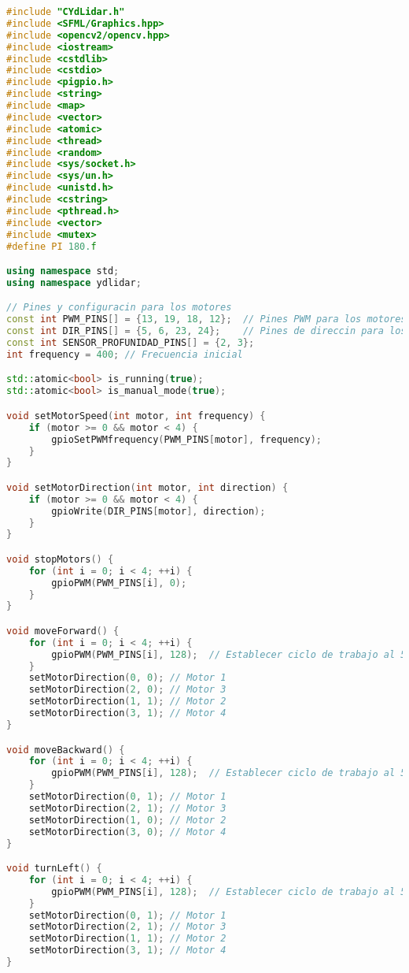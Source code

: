     \begin{lstlisting}[language={C++}, caption={Primer ajuste de c\'odigo}, label={Script}]
#include "CYdLidar.h"
#include <SFML/Graphics.hpp>
#include <opencv2/opencv.hpp>
#include <iostream>
#include <cstdlib>
#include <cstdio>
#include <pigpio.h>
#include <string>
#include <map>
#include <vector>
#include <atomic>
#include <thread>
#include <random>
#include <sys/socket.h>
#include <sys/un.h>
#include <unistd.h>
#include <cstring>
#include <pthread.h>
#include <vector>
#include <mutex>
#define PI 180.f

using namespace std;
using namespace ydlidar;

// Pines y configuracin para los motores
const int PWM_PINS[] = {13, 19, 18, 12};  // Pines PWM para los motores
const int DIR_PINS[] = {5, 6, 23, 24};    // Pines de direccin para los motores
const int SENSOR_PROFUNIDAD_PINS[] = {2, 3};
int frequency = 400; // Frecuencia inicial

std::atomic<bool> is_running(true);
std::atomic<bool> is_manual_mode(true);

void setMotorSpeed(int motor, int frequency) {
    if (motor >= 0 && motor < 4) {
        gpioSetPWMfrequency(PWM_PINS[motor], frequency);
    }
}

void setMotorDirection(int motor, int direction) {
    if (motor >= 0 && motor < 4) {
        gpioWrite(DIR_PINS[motor], direction);
    }
}

void stopMotors() {
    for (int i = 0; i < 4; ++i) {
        gpioPWM(PWM_PINS[i], 0);
    }
}

void moveForward() {
    for (int i = 0; i < 4; ++i) {
        gpioPWM(PWM_PINS[i], 128);  // Establecer ciclo de trabajo al 50%
    }
    setMotorDirection(0, 0); // Motor 1
    setMotorDirection(2, 0); // Motor 3
    setMotorDirection(1, 1); // Motor 2
    setMotorDirection(3, 1); // Motor 4
}

void moveBackward() {
    for (int i = 0; i < 4; ++i) {
        gpioPWM(PWM_PINS[i], 128);  // Establecer ciclo de trabajo al 50%
    }
    setMotorDirection(0, 1); // Motor 1
    setMotorDirection(2, 1); // Motor 3
    setMotorDirection(1, 0); // Motor 2
    setMotorDirection(3, 0); // Motor 4
}

void turnLeft() {
    for (int i = 0; i < 4; ++i) {
        gpioPWM(PWM_PINS[i], 128);  // Establecer ciclo de trabajo al 50%
    }
    setMotorDirection(0, 1); // Motor 1
    setMotorDirection(2, 1); // Motor 3
    setMotorDirection(1, 1); // Motor 2
    setMotorDirection(3, 1); // Motor 4
}


\end{lstlisting}
